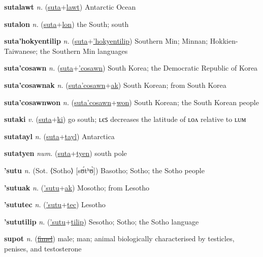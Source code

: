 \textbf{\hypertarget{sutalawt}{sutalawt}} \textit{n.} (\hyperlink{suta}{suta}+\allowbreak \hyperlink{lawt}{lawt})
Antarctic Ocean

\textbf{\hypertarget{sutalon}{sutalon}} \textit{n.} (\hyperlink{suta}{suta}+\allowbreak \hyperlink{lon}{lon})
the South; south

\textbf{\hypertarget{suta'hokyentilip}{suta'hokyentilip}} \textit{n.} (\hyperlink{suta}{suta}+\allowbreak \hyperlink{'hokyentilip}{'hokyentilip})
Southern Min; Minnan; Hokkien-Taiwanese; the Southern Min languages

\textbf{\hypertarget{suta'cosawn}{suta'cosawn}} \textit{n.} (\hyperlink{suta}{suta}+\allowbreak \hyperlink{'cosawn}{'cosawn})
South Korea; the Democratic Republic of Korea

\textbf{\hypertarget{suta'cosawnak}{suta'cosawnak}} \textit{n.} (\hyperlink{suta'cosawn}{suta'cosawn}+\allowbreak \hyperlink{ak}{ak})
South Korean; from South Korea

\textbf{\hypertarget{suta'cosawnwon}{suta'cosawnwon}} \textit{n.} (\hyperlink{suta'cosawn}{suta'cosawn}+\allowbreak \hyperlink{won}{won})
South Korean; the South Korean people

\textbf{\hypertarget{sutaki}{sutaki}} \textit{v.} (\hyperlink{suta}{suta}+\allowbreak \hyperlink{ki}{ki})
go south; ʟєꜱ decreases the latitude of ʟᴏᴧ relative to ʟᴜᴍ

\textbf{\hypertarget{sutatayl}{sutatayl}} \textit{n.} (\hyperlink{suta}{suta}+\allowbreak \hyperlink{tayl}{tayl})
Antarctica

\textbf{\hypertarget{sutatyen}{sutatyen}} \textit{num.} (\hyperlink{suta}{suta}+\allowbreak \hyperlink{tyen}{tyen})
south pole

\textbf{\hypertarget{'sutu}{'sutu}} \textit{n.} (Sot. ⟨Sotho⟩ [sʊ́tʰʊ̀])
Basotho; Sotho; the Sotho people

\textbf{\hypertarget{'sutuak}{'sutuak}} \textit{n.} (\hyperlink{'sutu}{'sutu}+\allowbreak \hyperlink{ak}{ak})
Mosotho; from Lesotho

\textbf{\hypertarget{'sututec}{'sututec}} \textit{n.} (\hyperlink{'sutu}{'sutu}+\allowbreak \hyperlink{tec}{tec})
Lesotho

\textbf{\hypertarget{'sututilip}{'sututilip}} \textit{n.} (\hyperlink{'sutu}{'sutu}+\allowbreak \hyperlink{tilip}{tilip})
Sesotho; Sotho; the Sotho language

\textbf{\hypertarget{supot}{supot}} \textit{n.} (\hyperlink{fimel}{\sout{fimel}})
male; man; animal biologically characterised by testicles, penises, and testosterone


